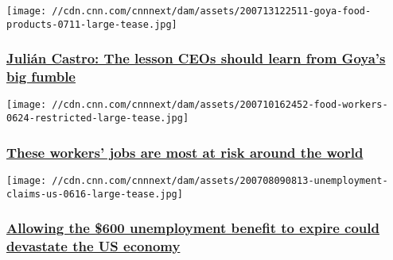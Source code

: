 \texttt{[image: //cdn.cnn.com/cnnnext/dam/assets/200713122511-goya-food-products-0711-large-tease.jpg]}

\hypertarget{juliuxe1n-castro-the-lesson-ceos-should-learn-from-goyas-big-fumble--1}{%
\subsubsection{\texorpdfstring{\href{/2020/07/14/perspectives/goya-boycott-julin-castro/index.html}{Julián
Castro: The lesson CEOs should learn from Goya's big fumble
}}{Julián Castro: The lesson CEOs should learn from Goya's big fumble }}\label{juliuxe1n-castro-the-lesson-ceos-should-learn-from-goyas-big-fumble--1}}

\href{/2020/07/12/perspectives/coronavirus-young-low-income-workers-imf/index.html}{}

\texttt{[image: //cdn.cnn.com/cnnnext/dam/assets/200710162452-food-workers-0624-restricted-large-tease.jpg]}

\hypertarget{these-workers-jobs-are-most-at-risk-around-the-world}{%
\subsubsection{\texorpdfstring{\href{/2020/07/12/perspectives/coronavirus-young-low-income-workers-imf/index.html}{These
workers' jobs are most at risk around the
world}}{These workers' jobs are most at risk around the world}}\label{these-workers-jobs-are-most-at-risk-around-the-world}}

\href{/2020/07/08/perspectives/unemployment-insurance-benefit/index.html}{}

\texttt{[image: //cdn.cnn.com/cnnnext/dam/assets/200708090813-unemployment-claims-us-0616-large-tease.jpg]}

\hypertarget{allowing-the-600-unemployment-benefit-to-expire-could-devastate-the-us-economy}{%
\subsubsection{\texorpdfstring{\href{/2020/07/08/perspectives/unemployment-insurance-benefit/index.html}{Allowing
the \$600 unemployment benefit to expire could devastate the US
economy}}{Allowing the \$600 unemployment benefit to expire could devastate the US economy}}\label{allowing-the-600-unemployment-benefit-to-expire-could-devastate-the-us-economy}}

\href{/2019/06/14/perspectives/marc-benioff-marco-lambertini-oceans-businesses/index.html}{}

